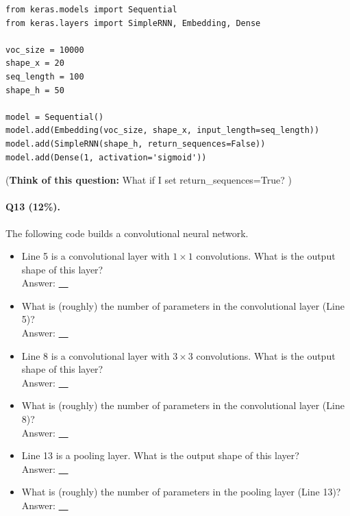 \documentclass[11pt]{article}
\numberwithin{equation}{section}
\begin{document}
\begin{lstlisting}
from keras.models import Sequential
from keras.layers import SimpleRNN, Embedding, Dense

voc_size = 10000 
shape_x = 20 
seq_length = 100 
shape_h = 50

model = Sequential()
model.add(Embedding(voc_size, shape_x, input_length=seq_length)) 
model.add(SimpleRNN(shape_h, return_sequences=False))
model.add(Dense(1, activation='sigmoid'))
\end{lstlisting}
\vspace{3mm}

\noindent
(\textbf{Think of this question:} What if I set \textsf{return\_sequences=True}? )

\vspace{3mm}




\paragraph{Q13 (12\%).} 
The following code builds a convolutional neural network.
\begin{itemize}
	\item 
	Line 5 is a convolutional layer with $1\times 1$ convolutions. 
	What is the output shape of this layer?\\
	Answer: \underline{~\qquad\qquad\qquad~}
	\item 
	What is (roughly) the number of parameters in the convolutional layer (Line 5)?\\
	Answer: \underline{~\qquad\qquad\qquad~}
	\item 
	Line 8 is a convolutional layer with $3\times 3$ convolutions. 
	What is the output shape of this layer?\\
	Answer: \underline{~\qquad\qquad\qquad~}
	\item 
	What is (roughly) the number of parameters in the convolutional layer (Line 8)?\\
	Answer: \underline{~\qquad\qquad\qquad~}
	\item 
	Line 13 is a pooling layer. 
	What is the output shape of this layer?\\
	Answer: \underline{~\qquad\qquad\qquad~}
	\item 
	What is (roughly) the number of parameters in the pooling layer (Line 13)?\\
	Answer: \underline{~\qquad\qquad\qquad~}
\end{itemize}
\end{document}
